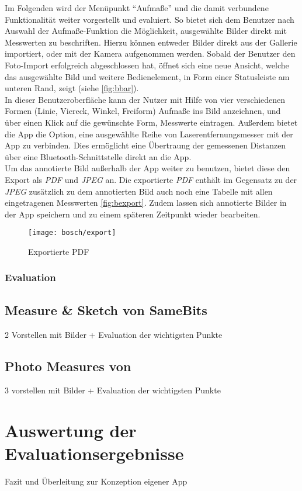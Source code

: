 Im Folgenden wird der Menüpunkt ``Aufmaße'' und die damit verbundene Funktionalität weiter vorgestellt und evaluiert.
So bietet sich dem Benutzer nach Auswahl der Aufmaße-Funktion die Möglichkeit, ausgewählte Bilder direkt mit Messwerten zu beschriften.
Hierzu können entweder Bilder direkt aus der Gallerie importiert, oder mit der Kamera aufgenommen werden.
Sobald der Benutzer den Foto-Import erfolgreich abgeschlossen hat, öffnet sich eine neue Ansicht, welche das ausgewählte Bild und weitere Bedienelement, in Form einer Statusleiste am unteren Rand, zeigt (siehe \autoref{fig:bbar}). \\

In dieser Benutzeroberfläche kann der Nutzer mit Hilfe von vier verschiedenen Formen (Linie, Viereck, Winkel, Freiform) Aufmaße ins Bild anzeichnen, und über einen Klick auf die gewünschte Form, Messwerte eintragen.
Außerdem bietet die App die Option, eine ausgewählte Reihe von Laserentfernungsmesser mit der App zu verbinden.
Dies ermöglicht eine Übertraung der gemessenen Distanzen über eine Bluetooth-Schnittstelle direkt an die App. \\

Um das annotierte Bild außerhalb der App weiter zu benutzen, bietet diese den Export als \emph{PDF} und \emph{JPEG} an.
Die exportierte \emph{PDF} enthält im Gegensatz zu der \emph{JPEG} zusätzlich zu dem annotierten Bild auch noch eine Tabelle mit allen eingetragenen Messwerten \autoref{fig:bexport}. 
Zudem lassen sich annotierte Bilder in der App speichern und zu einem späteren Zeitpunkt wieder bearbeiten.

\begin{figure}[h]
  \centering
  \texttt{[image: bosch/export]}
  \caption{Exportierte PDF}
  \label{fig:bexport}
\end{figure}

\subsubsection{Evaluation}


\subsection{Measure \& Sketch von SameBits}
2 Vorstellen mit Bilder + Evaluation der wichtigsten Punkte
\subsection{Photo Measures von }
3 vorstellen mit Bilder + Evaluation der wichtigsten Punkte

\section{Auswertung der Evaluationsergebnisse}
Fazit und Überleitung zur Konzeption eigener App

